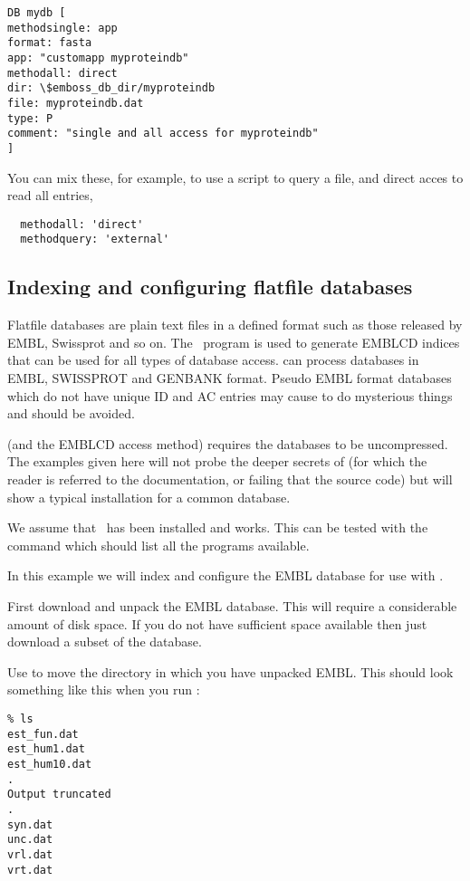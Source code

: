 \documentclass{report}
\begin{document}
\begin{verbatim}
DB mydb [
methodsingle: app
format: fasta
app: "customapp myproteindb"
methodall: direct
dir: \$emboss_db_dir/myproteindb
file: myproteindb.dat
type: P
comment: "single and all access for myproteindb"
]
\end{verbatim}

You can mix these, for example, to use a script to query a file, and
direct acces to read all entries,

\begin{verbatim}
  methodall: 'direct'
  methodquery: 'external'
\end{verbatim}

\subsection{Indexing and configuring flatfile databases}

Flatfile databases are plain text files in a defined format such as
those released by EMBL, Swissprot and so on. The \EMBOSS\ program
 is used to generate EMBLCD indices that can be used
for all types of database access.  can process
databases in EMBL, SWISSPROT and GENBANK format. Pseudo EMBL format
databases which do not have unique ID and AC entries may cause
 to do mysterious things and should be avoided.

 (and the EMBLCD access method) requires the
databases to be uncompressed. The examples given here will not probe
the deeper secrets of  (for which the reader is
referred to the documentation, or failing that the source code) but
will show a typical installation for a common database.

We assume that \EMBOSS\ has been installed and works. This can be
tested with the command  which should list all
the programs available.

In this example we will index and configure the EMBL database for use
with \EMBOSS.

First download and unpack the EMBL database. This will require a
considerable amount of disk space. If you do not have sufficient space
available then just download a subset of the database.

Use  to move the directory in which you have unpacked
EMBL. This should look something like this when you run :

\begin{verbatim}
% ls
est_fun.dat
est_hum1.dat
est_hum10.dat
.
Output truncated
.
syn.dat
unc.dat
vrl.dat
vrt.dat
\end{verbatim}
\end{document}
